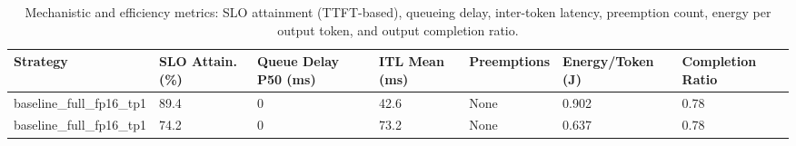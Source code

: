 \begin{table}
\caption{Mechanistic and efficiency metrics: SLO attainment (TTFT-based), queueing delay, inter-token latency, preemption count, energy per output token, and output completion ratio.}
\label{tab:efficiency}
\begin{tabular}{lllllll}
\toprule
Strategy & SLO Attain. (\%) & Queue Delay P50 (ms) & ITL Mean (ms) & Preemptions & Energy/Token (J) & Completion Ratio \\
\midrule
baseline\_full\_fp16\_tp1 & 89.4 & 0 & 42.6 & None & 0.902 & 0.78 \\
baseline\_full\_fp16\_tp1 & 74.2 & 0 & 73.2 & None & 0.637 & 0.78 \\
\bottomrule
\end{tabular}
\end{table}
